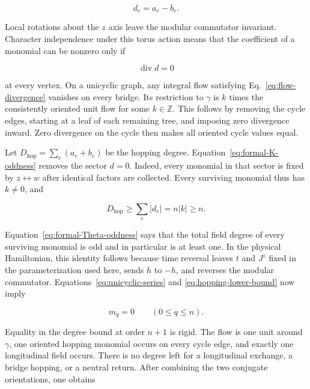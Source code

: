 \begin{equation}
 d_e=a_e-b_e.
 \label{eq:edge-flow}
\end{equation}

Local rotations about the $z$ axis leave the modular commutator invariant.
Character independence under this torus action means that the coefficient of
a monomial can be nonzero only if

\begin{equation}
 \operatorname{div}d=0
 \label{eq:flow-divergence}
\end{equation}

at every vertex.  On a unicyclic graph, any integral flow satisfying
Eq.~\eqref{eq:flow-divergence} vanishes on every bridge.  Its restriction to
$\gamma$ is $k$ times the consistently oriented unit flow for some
$k\in\mathbb Z$.  This follows by removing the cycle edges, starting at a
leaf of each remaining tree, and imposing zero divergence inward.  Zero
divergence on the cycle then makes all oriented cycle values equal.

Let $D_{\mathrm{hop}}=\sum_e(a_e+b_e)$ be the hopping degree.
Equation~\eqref{eq:formal-K-oddness} removes the sector $d=0$.  Indeed, every
monomial in that sector is fixed by $z\leftrightarrow w$ after identical
factors are collected.  Every surviving monomial thus has $k\neq0$, and

\begin{equation}
 D_{\mathrm{hop}}
 \geq\sum_e|d_e|
 =n|k|
 \geq n.
 \label{eq:hopping-lower-bound}
\end{equation}

Equation~\eqref{eq:formal-Theta-oddness} says that the total field degree of
every surviving monomial is odd and in particular is at least one.  In the
physical Hamiltonian, this identity follows because time reversal leaves $t$
and $J^z$ fixed in the parameterization used here, sends $h$ to $-h$, and
reverses the modular commutator.  Equations~\eqref{eq:unicyclic-series} and
\eqref{eq:hopping-lower-bound} now imply

\begin{equation}
 m_q=0\qquad(0\leq q\leq n).
 \label{eq:unicyclic-low-orders-zero}
\end{equation}

Equality in the degree bound at order $n+1$ is rigid.  The flow is one unit
around $\gamma$, one oriented hopping monomial occurs on every cycle edge,
and exactly one longitudinal field occurs.  There is no degree
left for a longitudinal exchange, a bridge hopping, or a neutral return.
After combining the two conjugate orientations, one obtains

